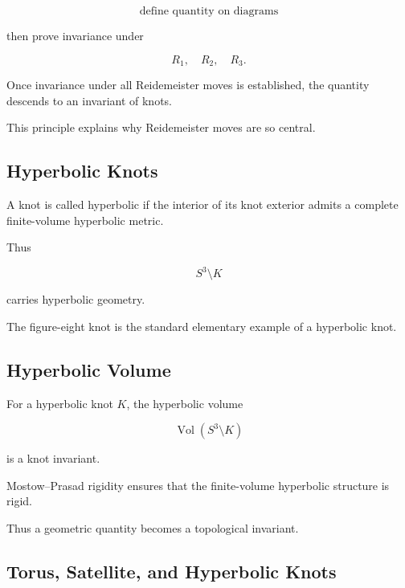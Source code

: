 \[
\boxed{
\text{define quantity on diagrams}
}
\]

then prove invariance under

\[
\boxed{
R_1,\quad R_2,\quad R_3.
}
\]

Once invariance under all Reidemeister moves is established, the quantity
descends to an invariant of knots.

This principle explains why Reidemeister moves are so central.

\subsection{Hyperbolic Knots}
\label{subsec:hyperbolic-knots}

A knot is called hyperbolic if the interior of its knot exterior admits a
complete finite-volume hyperbolic metric.

Thus

\[
\boxed{
S^3\setminus K
}
\]

carries hyperbolic geometry.

The figure-eight knot is the standard elementary example of a hyperbolic
knot.

\subsection{Hyperbolic Volume}
\label{subsec:knot-hyperbolic-volume}

For a hyperbolic knot \(K\), the hyperbolic volume

\[
\boxed{
\operatorname{Vol}(S^3\setminus K)
}
\]

is a knot invariant.

Mostow--Prasad rigidity ensures that the finite-volume hyperbolic structure
is rigid.

Thus a geometric quantity becomes a topological invariant.

\subsection{Torus, Satellite, and Hyperbolic Knots}
\label{subsec:torus-satellite-hyperbolic}

